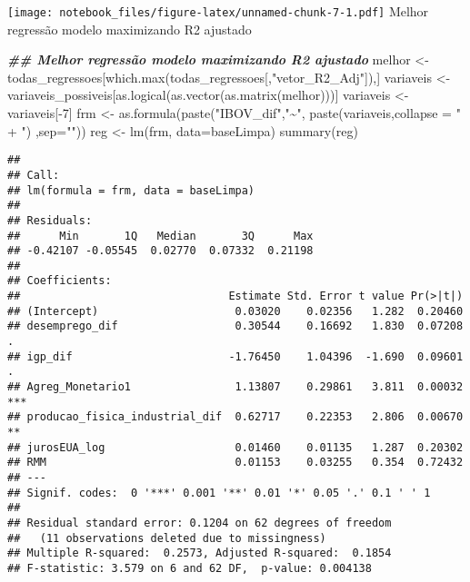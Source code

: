 \documentclass[
]{article}
\newenvironment{Shaded}{\begin{snugshade}}{\end{snugshade}}
\newcommand{\AttributeTok}[1]{\textcolor[rgb]{0.77,0.63,0.00}{#1}}
\newcommand{\DecValTok}[1]{\textcolor[rgb]{0.00,0.00,0.81}{#1}}
\newcommand{\DocumentationTok}[1]{\textcolor[rgb]{0.56,0.35,0.01}{\textbf{\textit{#1}}}}
\newcommand{\FunctionTok}[1]{\textcolor[rgb]{0.00,0.00,0.00}{#1}}
\newcommand{\NormalTok}[1]{#1}
\newcommand{\OtherTok}[1]{\textcolor[rgb]{0.56,0.35,0.01}{#1}}
\newcommand{\SpecialCharTok}[1]{\textcolor[rgb]{0.00,0.00,0.00}{#1}}
\newcommand{\StringTok}[1]{\textcolor[rgb]{0.31,0.60,0.02}{#1}}
\begin{document}
\texttt{[image: notebook\_files/figure-latex/unnamed-chunk-7-1.pdf]}
Melhor regressão modelo maximizando R2 ajustado

\begin{Shaded}
\begin{Highlighting}[]
\DocumentationTok{\#\# Melhor regressão modelo maximizando R2 ajustado}
\NormalTok{melhor }\OtherTok{\textless{}{-}}\NormalTok{ todas\_regressoes[}\FunctionTok{which.max}\NormalTok{(todas\_regressoes[,}\StringTok{"vetor\_R2\_Adj"}\NormalTok{]),]}
\NormalTok{variaveis }\OtherTok{\textless{}{-}}\NormalTok{ variaveis\_possiveis[}\FunctionTok{as.logical}\NormalTok{(}\FunctionTok{as.vector}\NormalTok{(}\FunctionTok{as.matrix}\NormalTok{(melhor)))]}
\NormalTok{variaveis }\OtherTok{\textless{}{-}}\NormalTok{ variaveis[}\SpecialCharTok{{-}}\DecValTok{7}\NormalTok{]}
\NormalTok{frm }\OtherTok{\textless{}{-}} \FunctionTok{as.formula}\NormalTok{(}\FunctionTok{paste}\NormalTok{(}\StringTok{"IBOV\_dif"}\NormalTok{,}\StringTok{"\textasciitilde{}"}\NormalTok{, }\FunctionTok{paste}\NormalTok{(variaveis,}\AttributeTok{collapse =} \StringTok{" + "}\NormalTok{)  ,}\AttributeTok{sep=}\StringTok{""}\NormalTok{))}
\NormalTok{reg }\OtherTok{\textless{}{-}} \FunctionTok{lm}\NormalTok{(frm, }\AttributeTok{data=}\NormalTok{baseLimpa)}
\FunctionTok{summary}\NormalTok{(reg)}
\end{Highlighting}
\end{Shaded}

\begin{verbatim}
## 
## Call:
## lm(formula = frm, data = baseLimpa)
## 
## Residuals:
##      Min       1Q   Median       3Q      Max 
## -0.42107 -0.05545  0.02770  0.07332  0.21198 
## 
## Coefficients:
##                                Estimate Std. Error t value Pr(>|t|)    
## (Intercept)                     0.03020    0.02356   1.282  0.20460    
## desemprego_dif                  0.30544    0.16692   1.830  0.07208 .  
## igp_dif                        -1.76450    1.04396  -1.690  0.09601 .  
## Agreg_Monetario1                1.13807    0.29861   3.811  0.00032 ***
## producao_fisica_industrial_dif  0.62717    0.22353   2.806  0.00670 ** 
## jurosEUA_log                    0.01460    0.01135   1.287  0.20302    
## RMM                             0.01153    0.03255   0.354  0.72432    
## ---
## Signif. codes:  0 '***' 0.001 '**' 0.01 '*' 0.05 '.' 0.1 ' ' 1
## 
## Residual standard error: 0.1204 on 62 degrees of freedom
##   (11 observations deleted due to missingness)
## Multiple R-squared:  0.2573, Adjusted R-squared:  0.1854 
## F-statistic: 3.579 on 6 and 62 DF,  p-value: 0.004138
\end{verbatim}
\end{document}
